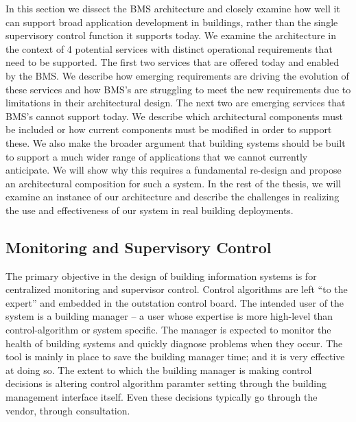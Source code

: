 In this section we dissect the BMS architecture and closely examine how well it can support broad application development
in buildings, rather than the single supervisory control function it supports today.  We examine the architecture in the context
of 4 potential services with distinct operational requirements that need to be supported.  The first two services that 
are offered today and enabled by the BMS.  We describe how emerging requirements are driving the evolution of these
services and how BMS's are struggling to meet the new requirements due to limitations in their architectural design.
The next two are emerging services that BMS's cannot support today.  We describe which architectural components must be included
or how current components must be modified in order to support these.  We also make the broader argument that 
building systems should be built to support a much wider range of applications that we cannot currently anticipate.
We will show why this requires a fundamental re-design and propose an architectural composition for such a system.
In the rest of the thesis, we will examine an instance of our architecture and describe the challenges in realizing
the use and effectiveness of our system in real building deployments.


\subsection{Monitoring and Supervisory Control}
The primary objective in the design of building information systems is for centralized monitoring and supervisor
control.  Control algorithms are left ``to the expert'' and embedded in the outstation control board.  The intended
user of the system is a building manager -- a user whose expertise is more high-level than control-algorithm or system specific.
The manager is expected to monitor the health of building systems and quickly diagnose problems when they occur.  The tool
is mainly in place to save the building manager time; and it is very effective at doing so.  The extent to which 
the building manager is making control decisions is altering control algorithm paramter setting through
the building management interface itself.  Even these decisions typically go through the vendor, through consultation.

